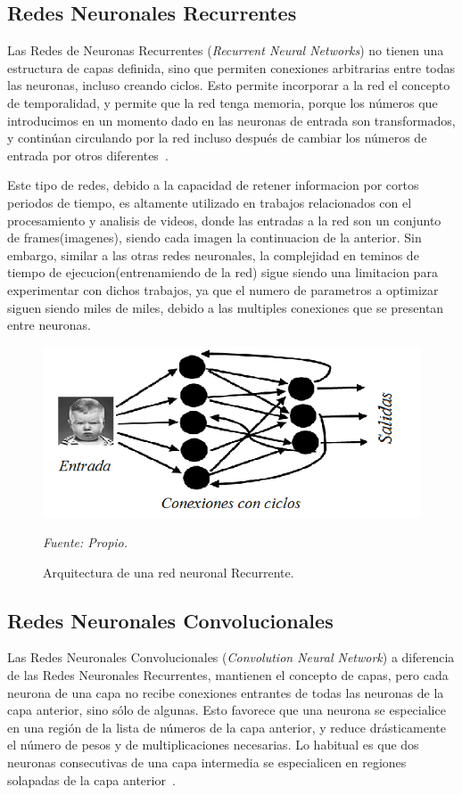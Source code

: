 \subsection{Redes Neuronales Recurrentes}
Las Redes de Neuronas Recurrentes (\textit{Recurrent Neural Networks}) no tienen una estructura de capas definida, sino que permiten conexiones arbitrarias entre todas las neuronas, incluso creando ciclos. Esto permite incorporar a la red el concepto de temporalidad, y permite que la red tenga memoria, porque los números que introducimos en un momento dado en las neuronas de entrada son transformados, y continúan circulando por la red incluso después de cambiar los números de entrada por otros diferentes~\cite{18restrepo2015aplicacion}.

Este tipo de redes, debido a la capacidad de retener informacion por cortos periodos de tiempo, es altamente utilizado en trabajos relacionados con el procesamiento y analisis de videos, donde las entradas a la red son un conjunto de frames(imagenes), siendo cada imagen la continuacion de la anterior. Sin embargo, similar a las otras redes neuronales, la complejidad en teminos de tiempo de ejecucion(entrenamiendo de la red) sigue siendo una limitacion para experimentar con dichos trabajos, ya que el numero de parametros a optimizar siguen siendo miles de miles, debido a las multiples conexiones que se presentan entre neuronas.  


\begin{figure}[H]
		\centering
		\includegraphics[width=130mm]{Imagenes/red_recurrente.png}
		\caption{Arquitectura de una red neuronal Recurrente.}
		\vspace{0.15cm}
		\textit{Fuente: Propio.}
		\label{fig:red_recurrente}
\end{figure}

\subsection{Redes Neuronales Convolucionales}
Las Redes Neuronales Convolucionales (\textit{Convolution Neural Network}) a diferencia de las Redes Neuronales Recurrentes, mantienen el concepto de capas, pero cada neurona de una capa no recibe conexiones entrantes de todas las neuronas de la capa anterior, sino sólo de algunas. Esto favorece que una neurona se especialice en una región de la lista de números de la capa anterior, y reduce drásticamente el número de pesos y de multiplicaciones necesarias. Lo habitual es que dos neuronas consecutivas de una capa intermedia se especialicen en regiones solapadas de la capa anterior~\cite{16pusiol2014redes}.

